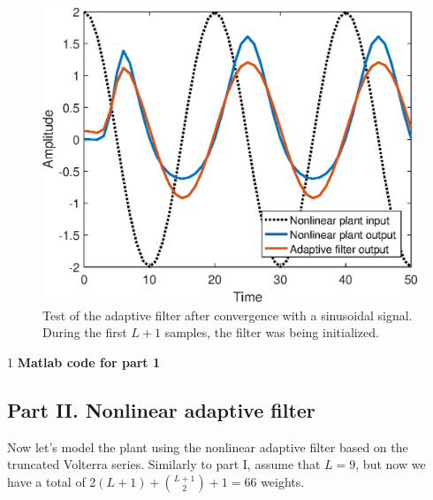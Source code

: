 \documentclass[10pt]{article}
\def\SOLUTIONS{0} %
\begin{document}
\begin{enumerate}[label=(\alph*)]
{		\FloatBarrier
		\begin{figure}[h!]
			\centering
			\includegraphics[scale=0.8]{figs/part1_test.eps}
			\caption{Test of the adaptive filter after convergence with a sinusoidal signal. During the first $L+1$ samples, the filter was being initialized.}
			\label{fig:part1-test}
		\end{figure}
		\FloatBarrier
	}
	\fi
	
	\if\SOLUTIONS1
	\textbf{Matlab code for part 1}
	
	\fi
	
\end{enumerate}

\subsection*{Part II. Nonlinear adaptive filter}

Now let's model the plant using the nonlinear adaptive filter based on the truncated Volterra series. Similarly to part I, assume that $L = 9$, but now we have a total of $2(L+1) + \binom{L+1}{2} + 1 = 66$ weights.
\end{document}
